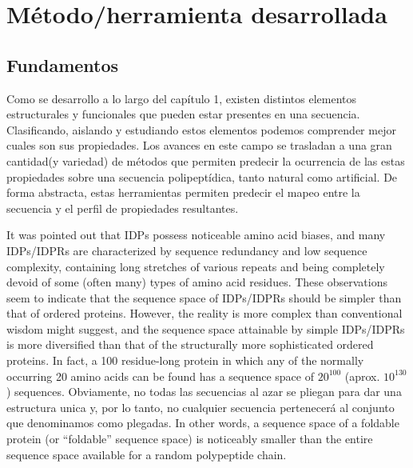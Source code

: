 
\chapter{Método/herramienta desarrollada}
\label{method}


\section{Fundamentos}



Como se desarrollo a lo largo del capítulo 1, existen distintos elementos estructurales y funcionales que pueden estar presentes en una secuencia.
Clasificando, aislando y estudiando estos elementos podemos comprender mejor cuales son sus propiedades. 
Los avances en este campo se trasladan a una gran cantidad(y variedad) de métodos que permiten predecir la ocurrencia de las estas propiedades sobre una secuencia polipeptídica, tanto natural como artificial.
De forma abstracta, estas herramientas permiten predecir el mapeo entre la secuencia y el perfil de propiedades resultantes. 
% 


It was pointed out that IDPs possess noticeable amino acid biases, and many IDPs/IDPRs are characterized by sequence redundancy and low sequence
complexity, containing long stretches of various repeats and being completely devoid of some (often many) types of amino acid residues. 
These observations seem to indicate that the sequence space of IDPs/IDPRs should be simpler than that of ordered proteins.
However, the reality is more complex than conventional wisdom might suggest, and the sequence space attainable by simple IDPs/IDPRs is more diversified than that of the structurally more sophisticated ordered proteins.
In fact, a 100 residue-long protein in which any of the normally occurring 20 amino acids can be found has a sequence space of $20^100$ (aprox. $10^130$) sequences. 
Obviamente, no todas las secuencias al azar se pliegan para dar una estructura unica y, por lo tanto, no cualquier secuencia pertenecerá al conjunto que denominamos como plegadas.
In other words, a sequence space of a foldable protein (or “foldable” sequence space) is noticeably smaller than the entire sequence space available for a random polypeptide chain\cite{dill1999polymer}. 

